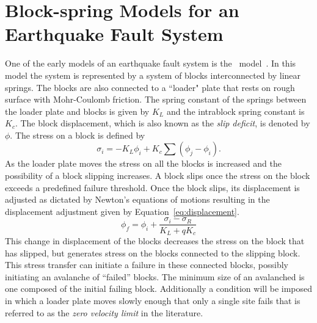 \section{Block-spring Models for an Earthquake Fault System}
\label{sect:blocksprings}
One of the early models of an earthquake fault system is the \bk\ model~\cite{brkp67}. In this model the system is represented by a system of blocks interconnected by linear springs. The blocks are also connected to a ``loader" plate that rests on  rough surface with Mohr-Coulomb friction. The spring constant of the springs between the loader plate and blocks is given by $K_L$ and the intrablock spring constant is $K_c$. The block displacement, which is also known as the \emph{slip deficit}, is denoted by $\phi$. The stress on a block is defined by %
\begin{equation}
 \label{eq:stress}
 \sigma_i = -K_L \phi_i + K_c \sum (\phi_j-\phi_i) . 
\end{equation}  %
As the loader plate moves the stress on all the blocks is increased and the possibility of a block slipping increases. A block slips once the stress on the block exceeds a predefined failure threshold. Once the block slips, its displacement is adjusted as dictated by Newton's equations of motions resulting in the displacement adjustment given by Equation~\eqref{eq:displacement}.
\begin{equation}
 \label{eq:displacement}
  \phi_f = \phi_i + \frac{\sigma_i - \sigma_R}{K_L +  qK_c} 
\end{equation} %
This change in displacement of the blocks decreases the stress on the block that has slipped, but generates stress on the blocks connected to the slipping block. This stress transfer can initiate a failure in these connected blocks, possibly initiating an avalanche of  ``failed'' blocks. The minimum size of an avalanched is one composed of the initial failing block. Additionally a condition will be imposed in which a loader plate moves slowly enough that only a single site fails that is referred to as the \textit{zero velocity limit} in the literature. 


